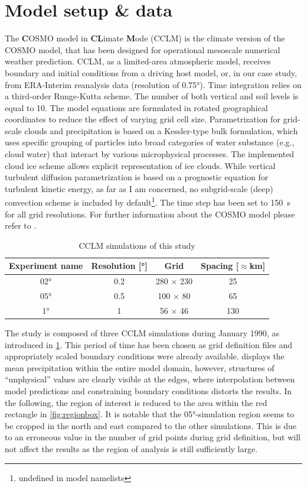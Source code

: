 \section{Model setup \& data}

The \textbf{C}OSMO model in \textbf{CL}imate \textbf{M}ode (CCLM) is the climate version of the COSMO model, that has been designed for operational mesoscale numerical weather prediction. CCLM, as a limited-area atmospheric model, receives boundary and initial conditions from a driving host model, or, in our case study, from ERA-Interim reanalysis data (resolution of 0.75°). Time integration relies on a third-order Runge-Kutta scheme. The number of both vertical and soil levels is equal to 10. The model equations are formulated in rotated geographical coordinates to reduce the effect of varying grid cell size. Parametrization for grid-scale clouds and precipitation is based on a Kessler-type bulk formulation, which uses specific grouping of particles into broad categories of water substance (e.g., cloud water) that interact by various microphysical processes. The implemented cloud ice scheme allows explicit representation of ice clouds. While vertical turbulent diffusion parametrization is based on a prognostic equation for turbulent kinetic energy, as far as I am concerned, no subgrid-scale (deep) convection scheme is included by default\footnote{ undefined in model namelists}.   
The time step has been set to \SI{150}{\s} for all grid resolutions. For further information about the COSMO model please refer to \textcite{schaettler2021}.

\begin{table}[h]
	\centering
	\begin{tabular}{cccc}
		\toprule
		Experiment name & Resolution [°] & Grid & Spacing [\(\approx\)km] \\
		\midrule
		02° & 0.2 & 280 \(\times\) 230 & 25 \\
		05° & 0.5 & 100 \(\times\) 80  & 65 \\
		1° & 1 & 56 \(\times\) 46      & 130 \\
		\bottomrule
	\end{tabular}
	\caption{CCLM simulations of this study}
	\label{tab:sims}
\end{table}

The study is composed of three CCLM simulations during January 1990, as introduced in \cref{tab:sims}. This period of time has been chosen as grid definition files and appropriately scaled boundary conditions were already available.  displays the mean precipitation within the entire model domain, however, structures of \enquote{unphysical} values are clearly visible at the edges, where interpolation between model predictions and constraining boundary conditions distorts the results. In the following, the region of interest is reduced to the area within the red rectangle in \cref{fig:regionbox}. It is notable that the 05°-simulation region seems to be cropped in the north and east compared to the other simulations. This is due to an erroneous value in the number of grid points during grid definition, but will not affect the results as the region of analysis is still sufficiently large. 

